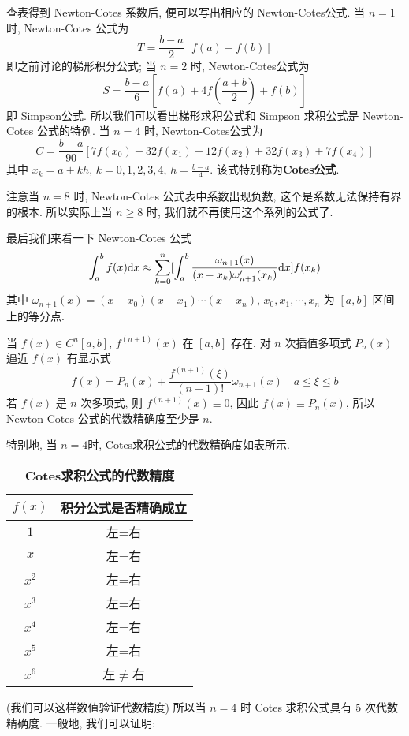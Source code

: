 \documentclass[a4paper]{ctexart}
\begin{document}
查表得到 Newton-Cotes 系数后, 便可以写出相应的 Newton-Cotes公式. 当 $n = 1$ 时, Newton-Cotes 公式为
\begin{equation}
T=\frac{b-a}{2}[f(a)+f(b)] 
\end{equation}
即之前讨论的梯形积分公式; 当 $n=2$ 时, Newton-Cotes公式为
\begin{equation}
S=\frac{b-a}{6}[f(a)+4f(\frac{a+b}{2})+f(b)]
\end{equation}
即 Simpson公式. 所以我们可以看出梯形求积公式和 Simpson 求积公式是 Newton-Cotes 公式的特例.
当 $n=4$ 时, Newton-Cotes公式为
\begin{equation}
C=\frac{b-a}{90}[7f(x_0)+32f(x_1)+12f(x_2)+32f(x_3)+7f(x_4)]
\end{equation}
其中 $x_k=a+kh$, $k = 0,1,2,3,4$, $h=\frac{b-a}{4}$. 该式特别称为{\bf Cotes公式}.

注意当 $n = 8$ 时, Newton-Cotes 公式表中系数出现负数, 这个是系数无法保持有界的根本. 所以实际上当 $n \geq 8$ 时, 
我们就不再使用这个系列的公式了. 

最后我们来看一下 Newton-Cotes 公式
$$
\int^b_af(x){\rm d}x\approx\sum^n_{k=0}[\int^b_a\frac{\omega_{n+1}(x)}{(x-x_k)\omega'_{n+1}(x_k)}{\rm d}x]
f(x_k)
$$
其中 $\omega_{n+1}(x)=(x-x_0)(x-x_1)\cdots(x-x_n)$, $x_0, x_1, \cdots, x_n$ 为 $[a, b]$ 区间上的等分点.

当 $f(x)\in C^n[a,b]$, $f^{(n+1)}(x)$ 在 $[a, b]$ 存在, 对 $n$ 次插值多项式 $P_n(x)$ 逼近 $f(x)$ 有显示式
\begin{equation}
f(x) = P_n(x)+\frac{f^{(n+1)}(\xi)}{(n+1)!}\omega_{n+1}(x)\quad
a\leq\xi\leq b 
\end{equation}
若 $f(x)$ 是 $n$ 次多项式, 则 $f^{(n+1)}(x)\equiv 0$, 因此 $f(x)\equiv P_n(x)$, 
所以 Newton-Cotes 公式的代数精确度至少是 $n$.

特别地, 当 $n=4$时, Cotes求积公式的代数精确度如表所示.

\begin{table}[h]
\caption{\bf Cotes求积公式的代数精度}
\begin{center}
 \begin{tabular}{|c|c|}\hline
 $f(x)$  &   积分公式是否精确成立 \\\hline
$1$  &  左=右 \\\hline $x$  &  左=右 \\\hline $x^2$  &  左=右
\\\hline $x^3$  &  左=右 \\\hline $x^4$  &  左=右 \\\hline $x^5$  &
左=右 \\\hline $x^6$  &  左$\neq$右 \\\hline
 \end{tabular}
\end{center}
\end{table}
(我们可以这样数值验证代数精度)
所以当 $n=4$ 时 Cotes 求积公式具有 $5$ 次代数精确度. 一般地, 我们可以证明:
\end{document}
